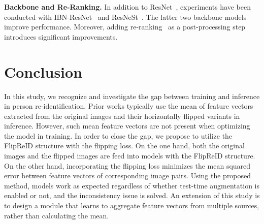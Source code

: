 \documentclass{article}
\begin{document}
\noindent\textbf{Backbone and Re-Ranking.}
In addition to ResNet~\cite{he2016deep}, experiments have been conducted with IBN-ResNet~\cite{pan2018two} and ResNeSt~\cite{zhang2020resnest}.
The latter two backbone models improve performance.
Moreover, adding re-ranking~\cite{zhong2017re} as a post-processing step introduces significant improvements.

\section{Conclusion}

In this study, we recognize and investigate the gap between training and inference in person re-identification.
Prior works typically use the mean of feature vectors extracted from the original images and their horizontally flipped variants in inference.
However, such mean feature vectors are not present when optimizing the model in training.
In order to close the gap, we propose to utilize the FlipReID structure with the flipping loss.
On the one hand, both the original images and the flipped images are feed into models with the FlipReID structure.
On the other hand, incorporating the flipping loss minimizes the mean squared error between feature vectors of corresponding image pairs.
Using the proposed method, models work as expected regardless of whether test-time augmentation is enabled or not, and the inconsistency issue is solved.
An extension of this study is to design a module that learns to aggregate feature vectors from multiple sources, rather than calculating the mean.



\end{document}
